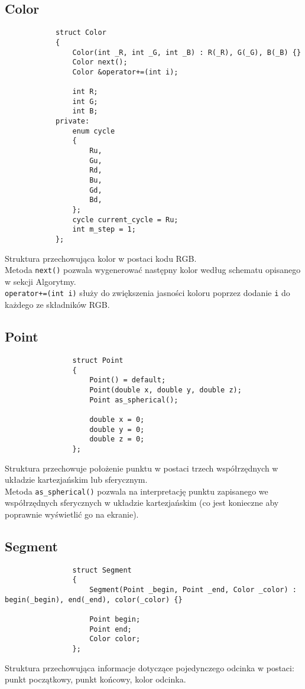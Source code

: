 		\subsection{Color}
			\begin{lstlisting}
			struct Color
			{
			    Color(int _R, int _G, int _B) : R(_R), G(_G), B(_B) {}
			    Color next();
			    Color &operator+=(int i);
			
			    int R;
			    int G;
			    int B;
			private:
			    enum cycle
			    {
			        Ru,
			        Gu,
			        Rd,
			        Bu,
			        Gd,
			        Bd,
			    };
			    cycle current_cycle = Ru;
			    int m_step = 1;
			};
			\end{lstlisting}
			Struktura przechowująca kolor w postaci kodu RGB.\\
			Metoda \lstinline|next()| pozwala wygenerować następny kolor według schematu opisanego w sekcji Algorytmy.\\
			\lstinline|operator+=(int i)| służy do zwiększenia jasności koloru poprzez dodanie \lstinline|i| do każdego ze składników RGB.
		\subsection{Point}
			\begin{lstlisting}
				struct Point
				{
				    Point() = default;
				    Point(double x, double y, double z);
				    Point as_spherical();

				    double x = 0;
				    double y = 0;
				    double z = 0;
				};
			\end{lstlisting}
			Struktura przechowuje położenie punktu w postaci trzech współrzędnych w układzie kartezjańskim lub sferycznym.\\
			Metoda \lstinline|as_spherical()| pozwala na interpretację punktu zapisanego we współrzędnych sferycznych w układzie kartezjańskim (co jest konieczne aby poprawnie wyświetlić go na ekranie).
		\subsection{Segment}
			\begin{lstlisting}
				struct Segment
				{
				    Segment(Point _begin, Point _end, Color _color) : begin(_begin), end(_end), color(_color) {}
				
				    Point begin;
				    Point end;
				    Color color;
				};
			\end{lstlisting}
			Struktura przechowująca informacje dotyczące pojedynczego odcinka w postaci: punkt początkowy, punkt końcowy, kolor odcinka.

